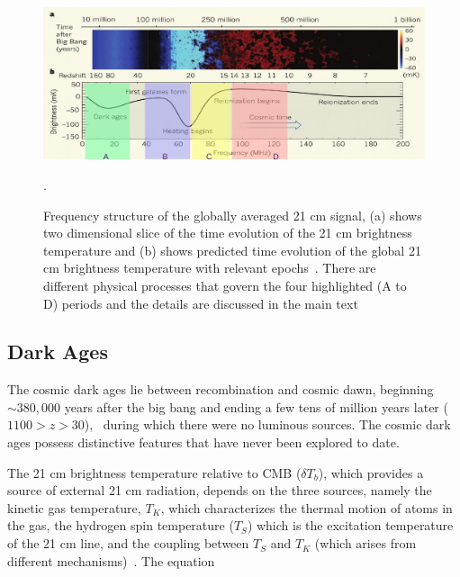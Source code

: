 	\begin{figure}
		\begin{center}
			\includegraphics[width=\linewidth]{Figures/epo.pdf}\\
			\caption{Frequency structure of the globally averaged 21 cm signal, (a) shows two dimensional slice of the time evolution of the 21 cm brightness temperature and (b) shows predicted time evolution of the global 21 cm brightness temperature with relevant epochs~\citep{2012RPPh...75h6901P}. There are different physical processes that govern the four highlighted (A to D) periods and the details are discussed in the main text}.
			
			
			\label{Fig:epochs}
		\end{center}
	\end{figure}
	
	\subsection{Dark Ages}
	
	The cosmic dark ages lie between recombination and cosmic dawn, beginning $\sim380,000$ years after the big bang and ending a few tens of million years later ($1100 > z > 30$),~\citep{2014arXiv1412.2096J} during which there were no luminous sources. The cosmic dark ages possess distinctive features that have never been explored to date. 
	
	
	The 21 cm brightness temperature relative to CMB ($\delta$$T_b$), which provides a source of external 21 cm radiation, depends on the three sources, namely the kinetic gas temperature, $T_K$, which characterizes the thermal motion of atoms in the gas, the hydrogen spin temperature ($T_S$) which is the excitation temperature of the 21 cm line, and the coupling between $T_S$ and $T_K$ (which arises from different mechanisms)~\citep{2015aska.confE...1K,2006PhR...433..181F}. The equation  
	
